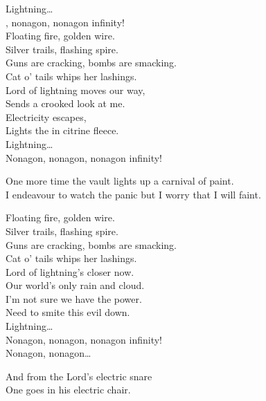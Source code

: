 Lightning… \\

, nonagon, nonagon infinity! \\

Floating fire, golden wire. \\
Silver trails, flashing spire. \\

Guns are cracking, bombs are smacking. \\
Cat o' tails whips her lashings. \\

Lord of lightning moves our way, \\
Sends a crooked look at me. \\
Electricity escapes, \\
Lights the  in citrine fleece. \\

Lightning… \\

Nonagon, nonagon, nonagon infinity! \\


One more time the vault lights up a carnival of paint. \\
I endeavour to watch the panic but I worry that I will faint. \\


Floating fire, golden wire. \\
Silver trails, flashing spire. \\
Guns are cracking, bombs are smacking. \\
Cat o' tails whips her lashings. \\

Lord of lightning's closer now. \\
Our world's only rain and cloud. \\
I'm not sure we have the power. \\
Need to smite this evil down. \\

Lightning… \\

Nonagon, nonagon, nonagon infinity! \\
Nonagon, nonagon… \\


And from the Lord's electric snare \\
One goes in his electric chair. \\

